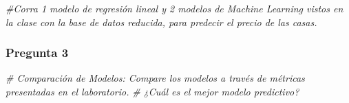 \documentclass[
]{article}
\newenvironment{Shaded}{\begin{snugshade}}{\end{snugshade}}
\newcommand{\CommentTok}[1]{\textcolor[rgb]{0.56,0.35,0.01}{\textit{#1}}}
\begin{document}
\begin{Shaded}
\begin{Highlighting}[]
\CommentTok{\#Corra 1 modelo de regresión lineal y 2 modelos de Machine Learning vistos en la clase con la base de datos reducida,  para predecir el precio de las casas.}
\end{Highlighting}
\end{Shaded}

\hypertarget{pregunta-3}{%
\subsubsection{Pregunta 3}\label{pregunta-3}}

\begin{Shaded}
\begin{Highlighting}[]
\CommentTok{\# Comparación de Modelos: Compare los modelos a través de métricas presentadas en el laboratorio. }
\CommentTok{\# ¿Cuál es el mejor modelo predictivo?}
\end{Highlighting}
\end{Shaded}
\end{document}
